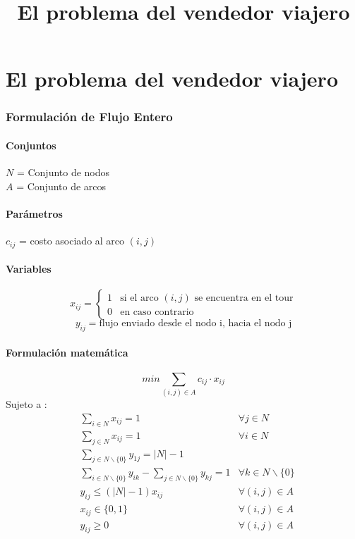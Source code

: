 \documentclass[5p]{article}
\title{El problema del vendedor viajero}
\begin{document}
\part{El problema del vendedor viajero}
\section{Formulación de Flujo Entero}
\subsection{Conjuntos}
$N$ = Conjunto de nodos\\
$A$ = Conjunto de arcos
\subsection{Parámetros}
$c_{ij}$ = costo asociado al arco $(i,j)$
\subsection{Variables}
\begin{flushleft}
\[x_{ij}={\begin{cases}1&{\mbox{si el arco $(i,j)$ se encuentra en el tour}}\\0&{\mbox{en caso contrario}}\end{cases}}
\]
\[y_{ij} = \mbox{flujo enviado desde el nodo i, hacia el nodo j}\]
\end{flushleft}
\subsection{Formulación matemática}
\begin{equation}
min \sum_{(i,j) \in A} c_{ij} \cdot x_{ij}
\end{equation}
Sujeto a : \begin{align}
& \sum_{i \in N} x_{ij} = 1 &\forall j \in N \\
& \sum_{j \in N} x_{ij} = 1 &\forall i \in N \\
& \sum_{j \in N \backslash \{0\}} y_{1j} = |N| - 	1 \\
& \sum_{i \in N \backslash \{0\}} y_{ik} - \sum_{j \in N \backslash \{0\}} y_{kj} = 1&\forall k \in N \backslash \{0\} \\
& y_{ij} \leq (|N| - 1) x_{ij} & \forall (i,j) \in A\\
& x_{ij} \in \{0,1\} &\forall (i,j) \in A\\
& y_{ij} \geq 0 &\forall (i,j) \in A
\end{align}
\end{document}
